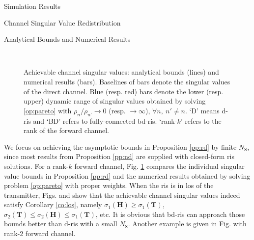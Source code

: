 \documentclass[journal]{IEEEtran}
\begin{document}
\begin{section}{Simulation Results}
\begin{subsection}{Channel Singular Value Redistribution}
		\begin{subsubsection}{Analytical Bounds and Numerical Results}
			\begin{figure}[!t]
				\centering
				\\
				\caption{
					Achievable channel singular values: analytical bounds (lines) and numerical results (bars).
					Baselines of bars denote the singular values of the direct channel.
					Blue (resp. red) bars denote the lower (resp. upper) dynamic range of singular values obtained by solving \eqref{op:pareto} with $\rho_n/\rho_{n'} \to 0$ (resp. $\to \infty$), $\forall n, \ n' \ne n$.
					`D' means \gls{d}-\gls{ris} and `BD' refers to fully-connected \gls{bd}-\gls{ris}.
					`rank-$k$' refers to the rank of the forward channel.
				}
				\label{fg:singular_bound}
			\end{figure}
			We focus on achieving the asymptotic bounds in Proposition \ref{pp:rd} by finite $N_\mathrm{S}$, since most results from Proposition \ref{pp:nd} are supplied with closed-form \gls{ris} solutions.
			For a rank-$k$ forward channel, Fig. \ref{fg:singular_bound} compares the individual singular value bounds in Proposition \ref{pp:rd} and the numerical results obtained by solving problem \eqref{op:pareto} with proper weights.
			When the \gls{ris} is in \gls{los} of the transmitter, Figs.  and  show that the achievable channel singular values indeed satisfy Corollary \ref{co:los}, namely $\sigma_1(\mathbf{H}) \ge \sigma_1(\mathbf{T})$, $\sigma_2(\mathbf{T}) \le \sigma_2(\mathbf{H}) \le \sigma_1(\mathbf{T})$, etc.
			It is obvious that \gls{bd}-\gls{ris} can approach those bounds better than \gls{d}-\gls{ris} with a small $N_\mathrm{S}$.
			Another example is given in Fig.  with rank-2 forward channel.

\end{subsubsection}
\end{subsection}
\end{section}
\end{document}
